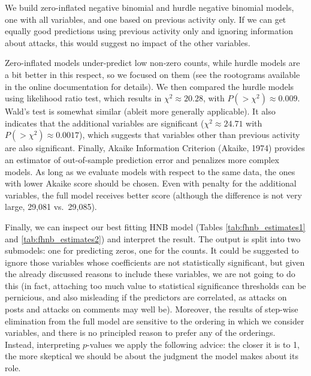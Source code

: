 \documentclass[
  10pt,
  dvipsnames]{scrartcl}
\begin{document}
\normalsize

We build zero-inflated negative binomial and hurdle negative binomial
models, one with all variables, and one based on previous activity only.
If we can get equally good predictions using previous activity only and
ignoring information about attacks, this would suggest no impact of the
other variables.

\footnotesize

\normalsize

Zero-inflated models under-predict low non-zero counts, while hurdle
models are a bit better in this respect, so we focused on them (see the
rootograms available in the online documentation for details). We then
compared the hurdle models using likelihood ratio test, which results in
\(\chi^2 \approx 20.28\), with \(P(>\chi^2)\approx 0.009\). Wald's test
is somewhat similar (ableit more generally applicable). It also
indicates that the additional variables are significant
(\(\chi^2 \approx 24.71\) with \(P(>\chi^2)\approx 0.0017\)), which
suggests that variables other than previous activity are also
significant. Finally, Akaike Information Criterion (Akaike, 1974)
provides an estimator of out-of-sample prediction error and penalizes
more complex models. As long as we evaluate models with respect to the
same data, the ones with lower Akaike score should be chosen. Even with
penalty for the additional variables, the full model receives better
score (although the difference is not very large, 29,081 vs.~29,085).

Finally, we can inspect our best fitting HNB model (Tables
\ref{tab:fhnb_estimates1} and \ref{tab:fhnb_estimates2}) and interpret
the result. The output is split into two submodels: one for predicting
zeros, one for the counts. It could be suggested to ignore those
variables whose coefficients are not statistically significant, but
given the already discussed reasons to include these variables, we are
not going to do this (in fact, attaching too much value to statistical
significance thresholds can be pernicious, and also misleading if the
predictors are correlated, as attacks on posts and attacks on comments
may well be). Moreover, the results of step-wise elimination from the
full model are sensitive to the ordering in which we consider variables,
and there is no principled reason to prefer any of the orderings.
Instead, interpreting \(p\)-values we apply the following advice: the
closer it is to 1, the more skeptical we should be about the judgment
the model makes about its role.
\end{document}
